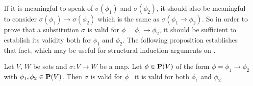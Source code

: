 If it is meaningful to speak of $\sigma(\phi_{1})$ and
$\sigma(\phi_{2})$, it should also be meaningful to consider
$\sigma(\phi_{1})\to\sigma(\phi_{2})$ which is the same as
$\sigma(\phi_{1}\to\phi_{2})$. So in order to prove that a
substitution $\sigma$ is valid for $\phi=\phi_{1}\to\phi_{2}$, it
should be sufficient to establish its validity both for $\phi_{1}$
and $\phi_{2}$. The following proposition establishes that fact,
which may be useful for structural induction arguments on \pv.
\begin{prop}\label{logic:prop:FOPL:valid:recursion:imp}
    Let $V$, $W$ be sets and $\sigma:V\to W$ be a map. Let $\phi\in\mbox{${\bf P}(V)$}$ 
    of the form $\phi=\phi_{1}\to\phi_{2}$ with $\phi_{1},\phi_{2}\in\mbox{${\bf P}(V)$}$. 
    Then $\sigma$ is valid for $\phi$ \ifand\ it is valid for both $\phi_{1}$ 
    and $\phi_{2}$.
\end{prop}
